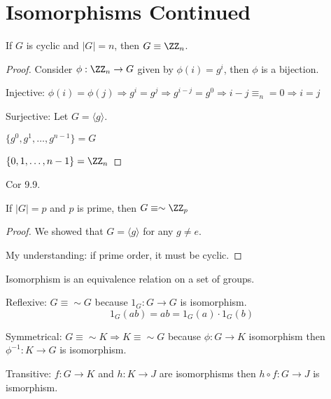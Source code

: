 \documentclass[class=scrartcl, crop=false]{standalone}
\begin{document}
\section{Isomorphisms Continued}

\begin{theorem}
  If $G$ is cyclic and $|G| = n$, then $G \equiv \ZZ_n$.
  \begin{proof}
    Consider $\phi:\ZZ_n \to G$ given by $\phi(i) = g^i$, then $\phi$ is a bijection.

    Injective:
    $\phi(i) = \phi(j) \Rightarrow g^i = g^j \Rightarrow g^{i - j} = g^0 \Rightarrow i - j \equiv_n = 0 \Rightarrow i = j$

    Surjective: 
    Let $G = \langle g \rangle.$

    $\{g^0, g^1, \dots, g^{n - 1}\} = G$

    $\{0, 1, \dots, n - 1\} = \ZZ_n$
  \end{proof}
\end{theorem}

\begin{theorem}
  Cor 9.9.

  If $|G| = p$ and $p$ is prime, then $G \equiv\sim \ZZ_p$

   \begin{proof}
     We showed that $G = \langle g \rangle $ for any $g \neq e$.

     My understanding: if prime order, it must be cyclic.
  \end{proof}
\end{theorem}

\begin{theorem}
  Isomorphism is an equivalence relation on a set of groups.

  Reflexive: $G \equiv\sim G$ because $1_G:G \to G$ is isomorphism. 
  \[1_G(ab) = ab = 1_G(a) \cdot 1_G(b)\]

  Symmetrical: $G \equiv\sim K \Rightarrow K \equiv\sim G$ because $\phi:G \to K$ isomorphism then $\phi^{-1}:K \to G$ is isomorphism.

  Transitive: $f: G \to K$ and $h:K \to J$ are isomorphisms then $h \circ f: G \to J$ is ismorphism.
\end{theorem}
\end{document}
